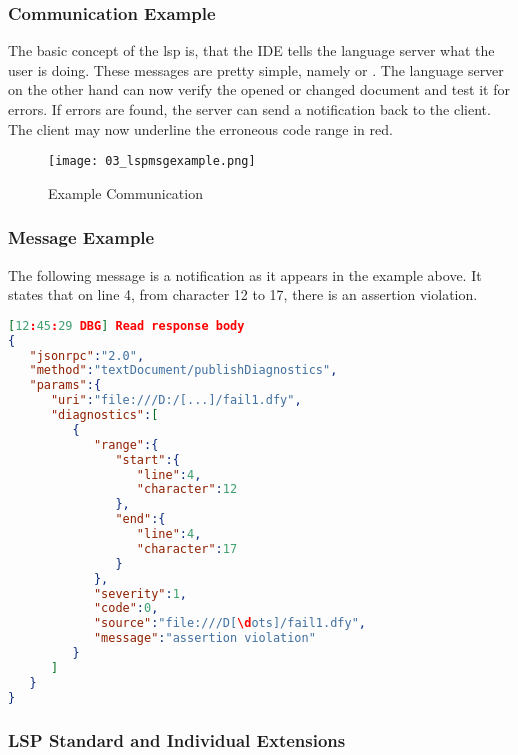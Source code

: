 \subsubsection{Communication Example}
The basic concept of the lsp is, that the IDE tells the language server what the user is doing. These messages are pretty simple, namely  or . The language server on the other hand can now verify the opened or changed document and test it for errors. If errors are found, the server can send a  notification back to the client. The client may now underline the erroneous code range in red. \cite{lspspec}

\begin{figure}[h]
    \centering
    \texttt{[image: 03\_lspmsgexample.png]}
    \caption{Example Communication}
    \label{fig:lspmsgexample}
\end{figure}

\subsubsection{Message Example}
The following message is a  notification as it appears in the example above. It states that on line 4, from character 12 to 17, there is an assertion violation.\\


\begin{lstlisting}[language=json, caption={LSP Message Example}, captionpos=b, label={lst:lspjsonmsg}]
[12:45:29 DBG] Read response body
{
   "jsonrpc":"2.0",
   "method":"textDocument/publishDiagnostics",
   "params":{
      "uri":"file:///D:/[...]/fail1.dfy",
      "diagnostics":[
         {
            "range":{
               "start":{
                  "line":4,
                  "character":12
               },
               "end":{
                  "line":4,
                  "character":17
               }
            },
            "severity":1,
            "code":0,
            "source":"file:///D[\dots]/fail1.dfy",
            "message":"assertion violation"
         }
      ]
   }
}
\end{lstlisting}

\subsubsection{LSP Standard and Individual Extensions}
\\

